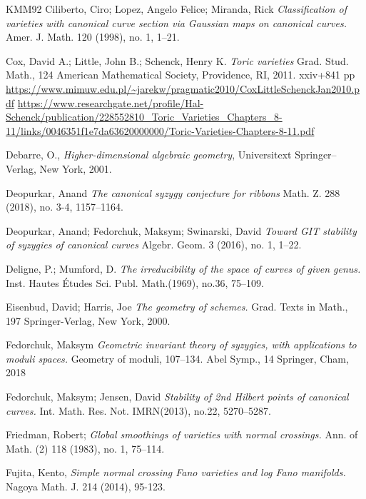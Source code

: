 \documentclass[11pt,twoside]{amsart}
\theoremstyle{plain}
\numberwithin{equation}{section}
\theoremstyle{definition}
\begin{document}
\begin{thebibliography}{KMM92}
Ciliberto, Ciro; Lopez, Angelo Felice; Miranda, Rick
\emph{Classification of varieties with canonical curve section via Gaussian maps on canonical curves.}
Amer. J. Math.   120 (1998), no. 1, 1–21.

Cox, David A.; Little, John B.; Schenck, Henry K.
\emph{Toric varieties}
Grad. Stud. Math., 124
American Mathematical Society, Providence, RI, 2011. xxiv+841 pp
\url{https://www.mimuw.edu.pl/~jarekw/pragmatic2010/CoxLittleSchenckJan2010.pdf}
\url{https://www.researchgate.net/profile/Hal-Schenck/publication/228552810_Toric_Varieties_Chapters_8-11/links/0046351f1e7da63620000000/Toric-Varieties-Chapters-8-11.pdf}

\color{black}
 Debarre, O., \emph{Higher-dimensional algebraic geometry}, 
Universitext Springer--Verlag, New York, 2001.
\color{black}

Deopurkar, Anand
\emph{The canonical syzygy conjecture for ribbons}
Math. Z. 288 (2018), no. 3-4, 1157–1164.

Deopurkar, Anand; Fedorchuk, Maksym; Swinarski, David
\emph{Toward GIT stability of syzygies of canonical curves}
Algebr. Geom. 3 (2016), no. 1, 1–22.


Deligne, P.; Mumford, D.
\emph{The irreducibility of the space of curves of given genus.}
Inst. Hautes Études Sci. Publ. Math.(1969), no.36, 75–109.

 Eisenbud, David; Harris, Joe 
\emph{The geometry of schemes.}
Grad. Texts in Math., 197
Springer-Verlag, New York, 2000.

Fedorchuk, Maksym
\emph{Geometric invariant theory of syzygies, with applications to moduli spaces.}
Geometry of moduli, 107–134. Abel Symp., 14 Springer, Cham, 2018

Fedorchuk, Maksym; Jensen, David
\emph{Stability of 2nd Hilbert points of canonical curves.}
Int. Math. Res. Not. IMRN(2013), no.22, 5270–5287.

Friedman, Robert; 
\emph{Global smoothings of varieties with normal crossings.} 
Ann. of Math. (2) 118 (1983), no. 1, 75--114.

 

\color{black}

 Fujita, Kento, \emph{Simple normal crossing Fano varieties and log Fano manifolds.}
Nagoya Math. J. 214 (2014), 95-123.


\end{thebibliography}
\end{document}

